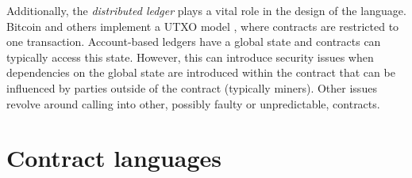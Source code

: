\documentclass{llncs}
\begin{document}
Additionally, the \emph{distributed ledger} plays a vital role in the design of the language. Bitcoin and others implement a UTXO model \cite{Nakamoto2008,Covaci2018}, where contracts are restricted to one transaction. Account-based ledgers have a global state and contracts can typically access this state. 
However, this can introduce security issues when dependencies on the global state are introduced within the contract that can be influenced by parties outside of the contract (typically miners). Other issues revolve around calling into other, possibly faulty or unpredictable, contracts.


%
%
%


\section{Contract languages}
\label{languages}
\end{document}
